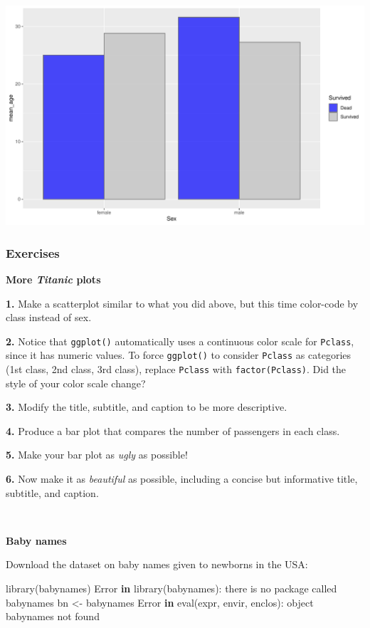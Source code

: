 \documentclass[
]{book}
\newenvironment{Shaded}{\begin{snugshade}}{\end{snugshade}}
\newcommand{\ControlFlowTok}[1]{\textcolor[rgb]{0.13,0.29,0.53}{\textbf{#1}}}
\newcommand{\FunctionTok}[1]{\textcolor[rgb]{0.00,0.00,0.00}{#1}}
\newcommand{\NormalTok}[1]{#1}
\newcommand{\OtherTok}[1]{\textcolor[rgb]{0.56,0.35,0.01}{#1}}
\newcommand{\SpecialCharTok}[1]{\textcolor[rgb]{0.00,0.00,0.00}{#1}}
\newcommand{\StringTok}[1]{\textcolor[rgb]{0.31,0.60,0.02}{#1}}
\begin{document}
\includegraphics{figures/unnamed-chunk-168-1.pdf}

\hypertarget{exercises-5}{%
\subsubsection*{Exercises}\label{exercises-5}}

\textbf{More \emph{Titanic} plots}

\textbf{1.} Make a scatterplot similar to what you did above, but this time color-code by class instead of sex.

\textbf{2.} Notice that \texttt{ggplot()} automatically uses a continuous color scale for \texttt{Pclass}, since it has numeric values. To force \texttt{ggplot()} to consider \texttt{Pclass} as categories (1st class, 2nd class, 3rd class), replace \texttt{Pclass} with \texttt{factor(Pclass)}. Did the style of your color scale change?

\textbf{3.} Modify the title, subtitle, and caption to be more descriptive.

\textbf{4.} Produce a bar plot that compares the number of passengers in each class.

\textbf{5.} Make your bar plot as \emph{ugly} as possible!

\textbf{6.} Now make it as \emph{beautiful} as possible, including a concise but informative title, subtitle, and caption.

~

\textbf{Baby names}

Download the dataset on baby names given to newborns in the USA:

\begin{Shaded}
\begin{Highlighting}[]
\FunctionTok{library}\NormalTok{(babynames)}
\NormalTok{Error }\ControlFlowTok{in} \FunctionTok{library}\NormalTok{(babynames)}\SpecialCharTok{:}\NormalTok{ there is no package called }\StringTok{\textquotesingle{}babynames\textquotesingle{}}
\NormalTok{bn }\OtherTok{\textless{}{-}}\NormalTok{ babynames}
\NormalTok{Error }\ControlFlowTok{in} \FunctionTok{eval}\NormalTok{(expr, envir, enclos)}\SpecialCharTok{:}\NormalTok{ object }\StringTok{\textquotesingle{}babynames\textquotesingle{}}\NormalTok{ not found}
\end{Highlighting}
\end{Shaded}
\end{document}
